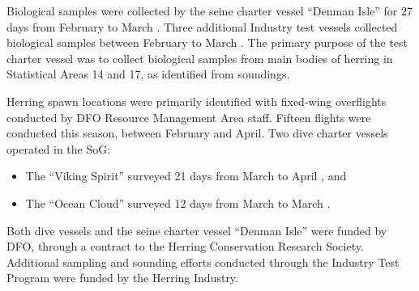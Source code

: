 Biological samples were collected by the seine charter vessel ``Denman Isle'' for 27 days from February  to March .
Three additional Industry test vessels collected biological samples between February  to March .
The primary purpose of the test charter vessel was to collect biological samples from main bodies of herring in Statistical Areas 14 and 17, as identified from soundings.

Herring spawn locations were primarily identified with fixed-wing overflights conducted by DFO Resource Management Area staff.
Fifteen flights were conducted this season, between February and April.
Two dive charter vessels operated in the SoG:
\begin{itemize}
\item The ``Viking Spirit'' surveyed 21 days from March  to April , and
\item The ``Ocean Cloud'' surveyed 12 days from March  to March .
\end{itemize}
Both dive vessels and the seine charter vessel ``Denman Isle'' were funded by DFO, through a contract to the Herring Conservation Research Society.
Additional sampling and sounding efforts conducted through the Industry Test Program were funded by the Herring Industry.